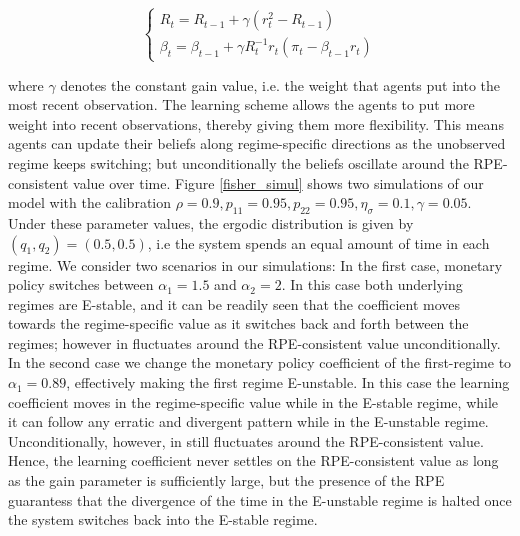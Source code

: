 \documentclass[12pt,reqno]{article}
\numberwithin{equation}{section}
\begin{document}
$$
\begin{cases}

R_t = R_{t-1} + \gamma (r_t^2 - R_{t-1} ) \\
\beta_t = \beta_{t-1} + \gamma R_t^{-1} r_t (\pi_t - \beta_{t-1} r_t) 
\end{cases}
$$

where $\gamma$ denotes the constant gain value, i.e. the weight that agents put into the most recent observation. The learning scheme allows the agents to put more weight into recent observations, thereby giving them more flexibility. This means agents can update their beliefs along regime-specific directions as the unobserved regime keeps switching; but unconditionally the beliefs oscillate around the RPE-consistent value over time. Figure \ref{fisher_simul} shows two simulations of our model with the calibration $\rho = 0.9, p_{11}=0.95, p_{22}= 0.95, \eta_{\sigma} = 0.1, \gamma=0.05 $. Under these parameter values, the ergodic distribution is given by $(q_1,q_2)=(0.5, 0.5) $, i.e the system spends an equal amount of time in each regime. We consider two scenarios in our simulations: In the first case, monetary policy switches between $\alpha_1=1.5$ and $\alpha_2 = 2 $. In this case both underlying regimes are E-stable, and it can be readily seen that the coefficient moves towards the regime-specific value as it switches back and forth between the regimes; however in fluctuates around the RPE-consistent value unconditionally. In the second case we change the monetary policy coefficient of the first-regime to $\alpha_1=0.89$, effectively making the first regime E-unstable. In this case the learning coefficient moves in the regime-specific value while in the E-stable regime, while it can follow any erratic and divergent pattern while in the E-unstable regime. Unconditionally, however, in still fluctuates around the RPE-consistent value. Hence, the learning coefficient never settles on the RPE-consistent value as long as the gain parameter is sufficiently large, but the presence of the RPE guarantess that the divergence of the time in the E-unstable regime is halted once the system switches back into the E-stable regime.\\


\end{document}
